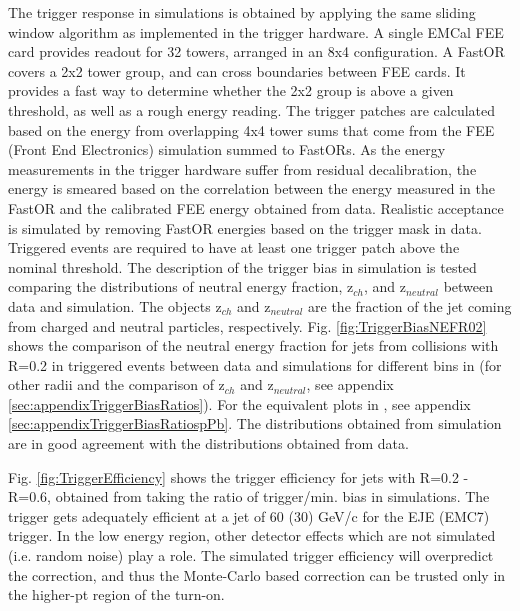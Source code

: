 The trigger response in simulations is obtained by applying the same sliding window algorithm as implemented in the trigger hardware. A single EMCal FEE card provides readout for 32 towers, arranged in an 8x4 configuration. A FastOR covers a 2x2 tower group, and can cross boundaries between FEE cards. It provides a fast way to determine whether the 2x2 group is above a given threshold, as well as a rough energy reading. The trigger patches are calculated based on the energy from overlapping 4x4 tower sums that come from the FEE (Front End Electronics) simulation summed to FastORs. As the energy measurements in the trigger hardware suffer from residual decalibration, the energy is smeared based on the correlation between the energy measured in the FastOR and the calibrated FEE energy obtained from data. Realistic acceptance is simulated by removing FastOR energies based on the trigger mask in data. Triggered events are required to have at least one trigger patch above the nominal threshold. The description of the trigger bias in simulation is tested comparing the distributions of neutral energy fraction, z$_{ch}$, and z$_{neutral}$ between data and simulation. The objects z$_{ch}$ and z$_{neutral}$ are the fraction of the jet \pT coming from charged and neutral particles, respectively. Fig. \ref{fig:TriggerBiasNEFR02} shows the comparison of the neutral energy fraction for jets from \pp collisions with R=0.2 in triggered events between data and simulations for different bins in \pT (for other radii and the comparison of z$_{ch}$ and z$_{neutral}$, see appendix \ref{sec:appendixTriggerBiasRatios}). For the equivalent plots in \pPb, see appendix \ref{sec:appendixTriggerBiasRatiospPb}. The distributions obtained from simulation are in good agreement with the distributions obtained from data. 

Fig. \ref{fig:TriggerEfficiency} shows the trigger efficiency for jets with R=0.2 - R=0.6, obtained from taking the ratio of trigger/min. bias in simulations. The trigger gets adequately efficient at a jet \pT of 60 (30) GeV/c for the EJE (EMC7) trigger. In the low energy region, other detector effects which are not simulated (i.e. random noise) play a role. The simulated trigger efficiency will overpredict the correction, and thus the Monte-Carlo based correction can be trusted only in the higher-pt region of the turn-on.

